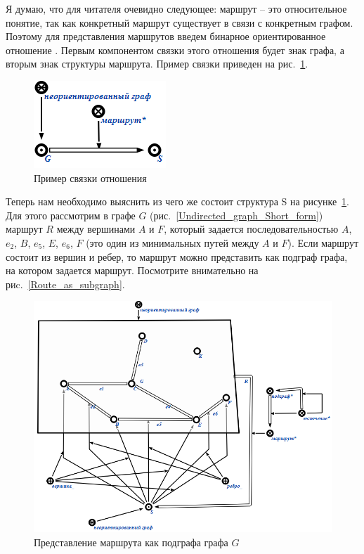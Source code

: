 Я думаю, что для читателя очевидно следующее: маршрут – это
относительное понятие, так как конкретный маршрут существует в связи с
конкретным графом. Поэтому для представления маршрутов введем бинарное
ориентированное отношение . Первым компонентом связки
этого отношения будет знак графа, а вторым знак структуры
маршрута. Пример связки приведен на
рис.~\ref{fig:Example_of_relations_Route_tuple}.

\begin{figure}[h]
  \centering
  \includegraphics{images/2/Example_of_relations_Route_tuple}
  \caption{Пример связки отношения }
  \label{fig:Example_of_relations_Route_tuple}
\end{figure}

Теперь нам необходимо выяснить из чего же состоит структура S на
рисунке~\ref{fig:Example_of_relations_Route_tuple}. Для этого
рассмотрим в графе $G$ (рис.~\ref{Undirected_graph_Short_form})
маршрут $R$ между вершинами $A$ и $F$, который задается последовательностью
$A$, $e_2$, $B$, $e_5$, $E$, $e_6$, $F$ (это один из минимальных путей между $A$ и
$F$). Если маршрут состоит из вершин и ребер, то маршрут можно
представить как подграф графа, на котором задается маршрут. Посмотрите
внимательно на риc.~\ref{Route_as_subgraph}.

\begin{figure}
  \centering
  \includegraphics[scale=0.8]{images/2/Route_as_subgraph}
  \caption{Представление маршрута как подграфа графа $G$}
  \label{fig:Route_as_subgraph}
\end{figure}

